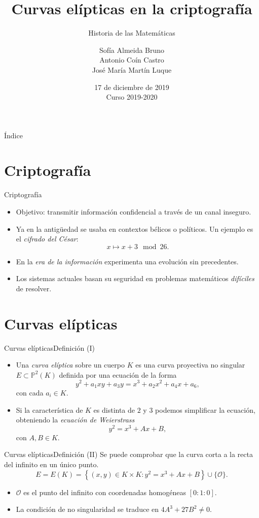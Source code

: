 \documentclass[spanish]{beamer}
\title{Curvas elípticas en la criptografía}
\subtitle{Historia de las Matemáticas}
\author{
  Sofía Almeida Bruno \texorpdfstring{\\}{}
  Antonio Coín Castro \texorpdfstring{\\}{}
  José María Martín Luque
}
\institute{\normalsize Universidad de Granada}
\date{17 de diciembre de 2019\texorpdfstring{\\}{} \small Curso 2019-2020}
\begin{document}
\maketitle

\begin{frame}{Índice}
  \tableofcontents
\end{frame}

\section{Criptografía}
\begin{frame}{Criptografía}
  \begin{itemize}
    \item Objetivo: transmitir información confidencial a través de un canal inseguro.
    \item Ya en la antigüedad se usaba en contextos bélicos o políticos. Un ejemplo es el \textit{cifrado del César}:
    \[x \mapsto x + 3 \mod 26.\]
    \item En la \textit{era de la información} experimenta una evolución sin precedentes.
    \item Los sistemas actuales basan su seguridad en problemas matemáticos \textit{difíciles} de resolver.
  \end{itemize}
\end{frame}

\section{Curvas elípticas}
\begin{frame}{Curvas elípticas}{Definición (I)}
  \begin{itemize}
    \item Una \textit{curva elíptica} sobre un cuerpo $K$ es una curva proyectiva no singular $E \subset \mathbb{P}^2(K)$ definida por una ecuación de la forma
    \[ y^2 + a_1xy + a_3y = x^3 +a_2x^2 + a_4x + a_6,\]
    con cada \(a_i \in K\).
    \item Si la característica de \(K\) es distinta de \(2\) y \(3\) podemos simplificar la ecuación, obteniendo la \textit{ecuación de Weierstrass}
    \[y^2 = x^3 + Ax + B,\]
    con \(A, B \in K\).
  \end{itemize}

\end{frame}

\begin{frame}{Curvas elípticas}{Definición (II)}
  Se puede comprobar que la curva corta a la recta del infinito en un único punto.
  \[ E = E(K) = \left\{ (x, y) \in K \times K : y^2 = x^3 + Ax + B\right\} \cup \big\{\mathcal{O}\big\}.\]
  \begin{itemize}
    \item \(\mathcal O\) es el punto del infinito con coordenadas homogéneas \([0:1:0]\).
    \item La condición de no singularidad se traduce en \(4A^3 + 27B^2 \neq 0\).
  \end{itemize}

\end{frame}
\end{document}
